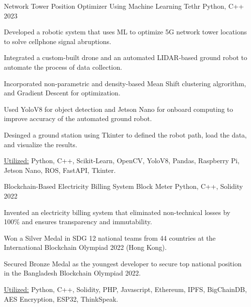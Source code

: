 

\begin{cventries}

  \cventryprojects
    {Network Tower Position Optimizer Using Machine Learning} %
    {Tethr} %
    {Python, C++} %
    {2023} %
    {
      \begin{cvitems} %
        \item {Developed a robotic system that uses ML to optimize 5G network tower locations 
        to solve cellphone signal abruptions.}
        \item {Integrated a custom-built drone and an automated LIDAR-based ground robot to automate the process of 
        data collection.}
        \item {Incorporated non-parametric and density-based Mean Shift clustering algrorithm, and Gradient Descent 
        for optimization.}
        \item {Used YoloV8 for object detection and Jetson Nano for onboard computing to improve accuracy of the automated 
        ground robot.}
        \item {Desinged a ground station using Tkinter to defined the robot path, load the data, and visualize the results.}
        \item {\underline{Utilized:} Python, C++, Scikit-Learn, OpenCV, YoloV8, Pandas, Raspberry Pi, Jetson Nano, ROS, FastAPI, Tkinter.}
      \end{cvitems}
      }
      
      \cventryprojects
      {Blockchain-Based Electricity Billing System } %
      {Block Meter} %
      {Python, C++, Solidity} %
      {2022} %
      {
        \begin{cvitems} %
          \item {Invented an electricity billing system that eliminated non-technical losses by 100\% and ensures transparency and immutability.}
          \item {Won a Silver Medal in SDG 12 national teams from 44 countries at the International Blockchain Olympiad 2022 (Hong Kong).}
          \item {Secured Bronze Medal as the youngest developer to secure top national position in the Bangladesh Blockchain Olympiad 2022.}
          \item {\underline{Utilized:} Python, C++, Solidity, PHP, Javascript, Ethereum, IPFS, BigChainDB, AES Encryption, ESP32, ThinkSpeak.}
        \end{cvitems}
        }
      

\end{cventries}
